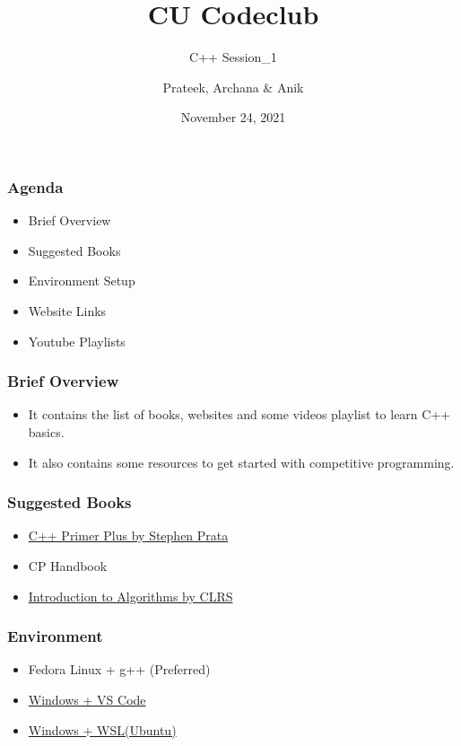 \documentclass[12pt]{beamer}
\author {Prateek, Archana \& Anik}
\title {CU Codeclub}
\subtitle {C++ Session\_1}
\date {November 24, 2021}
\begin{document}
\begin {frame}
\maketitle
\end {frame}

\begin {frame}
    \frametitle {Agenda}
    \begin {itemize}
        \item {Brief Overview}   
        \item {Suggested Books}  
        \item {Environment Setup}
        \item {Website Links} 
        \item {Youtube Playlists}
\end {itemize}       
\end {frame} 
          
           
\begin {frame}
    \frametitle {Brief Overview}
    \begin {itemize}
        \item {It contains the list of books, websites and some videos playlist to learn C++ basics.}   
        \item {It also contains some resources to get started with competitive programming.}  
	\end {itemize}       
\end {frame} 


\begin {frame}
    \frametitle {Suggested Books}
    \begin {itemize}          
        \item \href {https://zhjwpku.com/assets/pdf/books/C++.Primer.Plus.6th.Edition.Oct.2011.pdf} {C++ Primer Plus by Stephen Prata}  
       
		\item {CP Handbook}       
       
        \item  \href {https://edutechlearners.com/download/Introduction\_to\_algorithms-3rd\%20Edition.pdf}  {Introduction to Algorithms by CLRS}     
       
    \end {itemize}        
\end {frame}   


\begin {frame}
    \frametitle {Environment}
    \begin {itemize}          
        \item {Fedora Linux + g++ (Preferred)}  
       
        \item  \href {https://code.visualstudio.com/docs/?dv=win}  {Windows + VS Code}     
               
        \item  \href {https://cdn.we.talentsprint.com/tools_setup/installation.html }  {Windows + WSL(Ubuntu)}    
       
    \end {itemize}        
\end {frame}   
\end{document}
